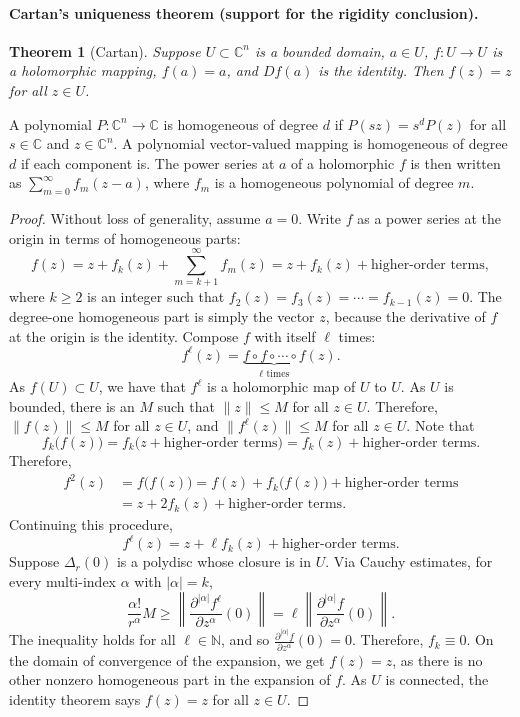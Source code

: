 \documentclass[UTF8,11pt]{ctexart}
\newtheorem*{thm}{Theorem}
\theoremstyle{definition}
\newcommand{\C}{\mathbb C}
\newcommand{\N}{\mathbb N}
\begin{document}
\paragraph{Cartan's uniqueness theorem (support for the rigidity conclusion).}
\begin{thm}[Cartan]
Suppose $U\subset\C^n$ is a bounded domain, $a\in U$, $f:U\to U$ is a holomorphic mapping, $f(a)=a$, and $Df(a)$ is the identity. Then $f(z)=z$ for all $z\in U$.
\end{thm}
A polynomial $P:\C^n\to\C$ is homogeneous of degree $d$ if $P(sz)=s^dP(z)$ for all $s\in\C$ and $z\in\C^n$. A polynomial vector-valued mapping is homogeneous of degree $d$ if each component is. The power series at $a$ of a holomorphic $f$ is then written as $\sum_{m=0}^\infty f_m(z-a)$, where $f_m$ is a homogeneous polynomial of degree $m$.
\begin{proof}
Without loss of generality, assume $a=0$. Write $f$ as a power series at the origin in terms of homogeneous parts:
\[
f(z)=z+f_k(z)+\sum_{m=k+1}^\infty f_m(z)=z+f_k(z)+\text{higher-order terms},
\]
where $k\geq2$ is an integer such that $f_2(z)=f_3(z)=\cdots=f_{k-1}(z)=0$. The degree-one homogeneous part is simply the vector $z$, because the derivative of $f$ at the origin is the identity. Compose $f$ with itself $\ell$ times:
\[f^\ell(z)=\underbrace{f\circ f\circ\cdots\circ f}_{\ell\text{ times}}(z).\]
As $f(U)\subset U$, we have that $f^\ell$ is a holomorphic map of $U$ to $U$. As $U$ is bounded, there is an $M$ such that $\|z\|\leq M$ for all $z\in U$. Therefore, $\|f(z)\|\leq M$ for all $z\in U$, and $\|f^\ell(z)\|\leq M$ for all $z\in U$. Note that
\[f_k\bigl(f(z)\bigr)=f_k\bigl(z+\text{higher-order terms}\bigr)=f_k(z)+\text{higher-order terms}.\]
Therefore,
\begin{align*}
f^2(z)&=f\bigl(f(z)\bigr)=f(z)+f_k\bigl(f(z)\bigr)+\text{higher-order terms}\\
&=z+2f_k(z)+\text{higher-order terms}.
\end{align*}
Continuing this procedure,
\[f^\ell(z)=z+\ell f_k(z)+\text{higher-order terms}.\]
Suppose $\Delta_r(0)$ is a polydisc whose closure is in $U$. Via Cauchy estimates, for every multi-index $\alpha$ with $|\alpha|=k$,
\[
\frac{\alpha!}{r^\alpha}M\geq\left\|\frac{\partial^{|\alpha|}f^\ell}{\partial z^\alpha}(0)\right\|=\ell\left\|\frac{\partial^{|\alpha|}f}{\partial z^\alpha}(0)\right\|.
\]
The inequality holds for all $\ell\in\N$, and so $\frac{\partial^{|\alpha|}f}{\partial z^\alpha}(0)=0$. Therefore, $f_k\equiv0$. On the domain of convergence of the expansion, we get $f(z)=z$, as there is no other nonzero homogeneous part in the expansion of $f$. As $U$ is connected, the identity theorem says $f(z)=z$ for all $z\in U$.
\end{proof}
\end{document}
